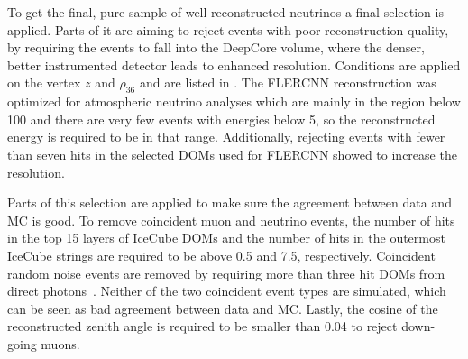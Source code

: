 To get the final, pure sample of well reconstructed neutrinos a final selection is applied. Parts of it are aiming to reject events with poor reconstruction quality, by requiring the events to fall into the DeepCore volume, where the denser, better instrumented detector leads to enhanced resolution. Conditions are applied on the vertex $z$ and $\rho_{36}$ and are listed in . The FLERCNN reconstruction was optimized for atmospheric neutrino analyses which are mainly in the region below \SI{100}{\gev} and there are very few events with energies below \SI{5}{\gev}, so the reconstructed energy is required to be in that range. Additionally, rejecting events with fewer than seven hits in the selected DOMs used for FLERCNN showed to increase the resolution.

Parts of this selection are applied to make sure the agreement between data and MC is good. To remove coincident muon and neutrino events, the number of hits in the top 15 layers of IceCube DOMs and the number of hits in the outermost IceCube strings are required to be above 0.5 and 7.5, respectively. Coincident random noise events are removed by requiring more than three hit DOMs from direct photons~\cite{low_energy_reco_IC}. Neither of the two coincident event types are simulated, which can be seen as bad agreement between data and MC. Lastly, the cosine of the reconstructed zenith angle is required to be smaller than 0.04 to reject down-going muons.

